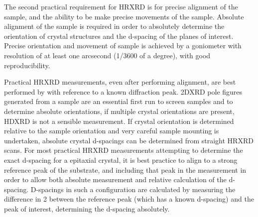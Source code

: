 The second practical requirement for HRXRD is for precise alignment of the sample, and the ability to be make precise movements of the sample.
Absolute alignment of the sample is required in order to absolutely determine the orientation of crystal structures and the d-spacing of the planes of interest.
Precise orientation and movement of sample is achieved by a goniometer with resolution of at least one arcsecond (1/3600 of a degree), with good reproducibility.

Practical HRXRD measurements, even after performing alignment, are best performed by with reference to a known diffraction peak.
2DXRD pole figures generated from a sample are an essential first run to screen samples and to determine absolute orientations, if multiple crystal orientations are present, HDXRD is not a sensible measurement.
If crystal orientation is determined relative to the sample orientation and very careful sample mounting is undertaken, absolute crystal d-spacings can be determined from straight HRXRD scans.
For most practical HRXRD measurements attempting to determine the exact d-spacing for a epitaxial crystal, it is best practice to align to a strong reference peak of the substrate, and including that peak in the measurement in order to allow both absolute measurement and relative calculation of the d-spacing.
D-spacings in such a configuration are calculated by measuring the difference in 2\straighttheta{} between the reference peak (which has a known d-spacing) and the peak of interest, determining the d-spacing absolutely.

